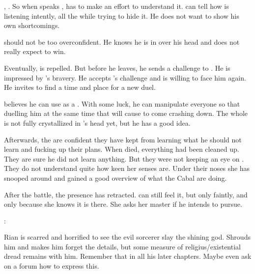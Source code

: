 , \Teshrial {}. 
So when \Ishnaruchaefir speaks \Draconic, \Teshrial has to make an effort to understand it. 
\Criseis can tell how \Teshrial is listening intently, all the while trying to hide it.
He does not want to show his own shortcomings. 

\Teshrial{} should not be too overconfident. 
He knows he is in over his head and does not really expect to win. 

Eventually, \Ishnaruchaefir is repelled. 
But before he leaves, he sends a challenge to \Teshrial.
He is impressed by \Teshrial's bravery.
He accepts \Teshrial's challenge and is willing to face him again.
He invites \Teshrial to find a time and place for a new duel.


\Ishnaruchaefir believes he can use \Teshrial as a .
With some luck, he can manipulate everyone so that \Teshrial duelling him at the same time that \Secherdamon will cause \Malcur to come crashing down.
The whole  is not fully crystallized in \Ishnaruchaefir's head yet, but he has a good idea.

Afterwards, the \resphain are confident they have kept \Ishnaruchaefir from learning what he should not learn and fucking up their plans. 
When \Teshrial died, everything had been cleaned up.
They are sure he did not learn anything.
But they were not keeping an eye on \Criseis.
They do not understand quite how keen her senses are.
Under their noses she has snooped around and gained a good overview of what the Cabal are doing. 

After the battle, the \noggyal presence has retracted. 
\Criseis can still feel it, but only faintly, and only because she knows it is there.
She asks her master if he intends to pursue.

\Ishnaruchaefir:

Rian is scarred and horrified to see the evil sorcerer slay the shining god. 
\Criseis Shrouds him and makes him forget the details, but some measure of religius/existential dread remains with him. 
Remember that in all his later chapters.
Maybe even ask on a forum how to express this. 

